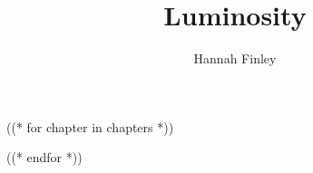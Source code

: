 \documentclass[((( font_size|escape_tex )))pt,((( paper_sides|escape_tex 
)))]{memoir}
\begin{document}
\title{Luminosity}
\author{Hannah Finley}
\beforechapters

((* for chapter in chapters *))

((* endfor *))

\afterchapters
\end{document}
